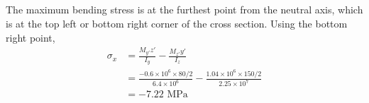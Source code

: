 \subsection{}
The maximum bending stress is at the furthest point from the neutral axis, which is at the top left 
or bottom right corner of the cross section. Using the bottom right point,
\begin{align*}
    \sigma_{x}  &= \frac{M_{y'} z'}{I_y} - \frac{M_{z'} y'}{I_z} \\ 
    &= \frac{-0.6 \times 10^6 \times 80/2}{6.4 \times 10^6} - \frac{1.04 \times 10^6 \times 150/2}{2.25 \times 10^7} \\
    &= \boxed{-7.22 \text{ MPa}}
\end{align*}